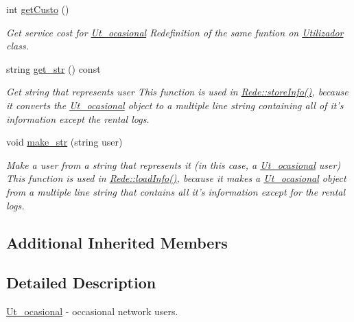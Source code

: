 \begin{DoxyCompactItemize}
\item 
int \hyperlink{class_ut__ocasional_a372c795cc67b402e54dc78e6e24c3779}{get\+Custo} ()
\begin{DoxyCompactList}\small\item\em Get service cost for \hyperlink{class_ut__ocasional}{Ut\+\_\+ocasional} Redefinition of the same funtion on \hyperlink{class_utilizador}{Utilizador} class. \end{DoxyCompactList}\item 
string \hyperlink{class_ut__ocasional_a500c4745815fed11a495c258a06f973a}{get\+\_\+str} () const 
\begin{DoxyCompactList}\small\item\em Get string that represents user This function is used in \hyperlink{class_rede_abec1da6660663cd58e6851737219959e}{Rede\+::store\+Info()}, because it converts the \hyperlink{class_ut__ocasional}{Ut\+\_\+ocasional} object to a multiple line string containing all of it's information except the rental logs. \end{DoxyCompactList}\item 
\hypertarget{class_ut__ocasional_a215c8d086f1285c12e5bb8b42ccef682}{void \hyperlink{class_ut__ocasional_a215c8d086f1285c12e5bb8b42ccef682}{make\+\_\+str} (string user)}\label{class_ut__ocasional_a215c8d086f1285c12e5bb8b42ccef682}

\begin{DoxyCompactList}\small\item\em Make a user from a string that represents it (in this case, a \hyperlink{class_ut__ocasional}{Ut\+\_\+ocasional} user) This function is used in \hyperlink{class_rede_a1751f922073f6172ba676a56959a1540}{Rede\+::load\+Info()}, because it makes a \hyperlink{class_ut__ocasional}{Ut\+\_\+ocasional} object from a multiple line string that contains all it's information except for the rental logs. \end{DoxyCompactList}\end{DoxyCompactItemize}
\subsection*{Additional Inherited Members}


\subsection{Detailed Description}
\hyperlink{class_ut__ocasional}{Ut\+\_\+ocasional} -\/ occasional network users. 

